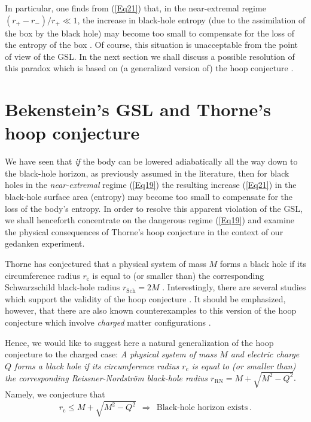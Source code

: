 \documentclass[12pt,preprintnumbers,amsmath,amssymbm,prd]{revtex4-1}
\begin{document}
In particular, one finds from (\ref{Eq21}) that, in the
near-extremal regime $(r_+-r_-)/r_+\ll1$, the increase in black-hole
entropy (due to the assimilation of the box by the black hole) may
become too small to compensate for the loss of the entropy of the
box \cite{Noteneg}. Of course, this situation is unacceptable from
the point of view of the GSL. In the next section we shall discuss a
possible resolution of this paradox which is based on (a generalized
version of) the hoop conjecture \cite{Thorne}.

\section{Bekenstein's GSL and Thorne's hoop conjecture}

We have seen that {\it if} the body can be lowered adiabatically all
the way down to the black-hole horizon, as previously assumed in the
literature, then for black holes in the {\it near-extremal} regime
(\ref{Eq19}) the resulting increase (\ref{Eq21}) in the black-hole
surface area (entropy) may become too small to compensate for the
loss of the body's entropy. In order to resolve this apparent
violation of the GSL, we shall henceforth concentrate on the
dangerous regime (\ref{Eq19}) and examine the physical consequences
of Thorne's hoop conjecture \cite{Thorne} in the context of our
gedanken experiment.

Thorne \cite{Thorne} has conjectured that a physical system of mass
$M$ forms a black hole if its circumference radius $r_{\text{c}}$ is
equal to (or smaller than) the corresponding Schwarzschild
black-hole radius $r_{\text{Sch}}=2M$ \cite{Norefr}. Interestingly,
there are several studies which support the validity of the hoop
conjecture \cite{Teuk}. It should be emphasized, however, that there
are also known counterexamples to this version of the hoop
conjecture which involve {\it charged} matter configurations
\cite{Leon,Hak}.

Hence, we would like to suggest here a natural generalization of the
hoop conjecture to the charged case: {\it A physical system of mass
$M$ and electric charge $Q$ forms a black hole if its circumference
radius $r_{\text{c}}$ is equal to (or smaller than) the
corresponding Reissner-Nordstr\"om black-hole radius
$r_{\text{RN}}=M+\sqrt{M^2-Q^2}$}. Namely, we conjecture that
\begin{equation}\label{Eq22}
r_{\text{c}}\leq M+\sqrt{M^2-Q^2}\ \  \Longrightarrow \ \
\text{Black-hole horizon exists}\  .
\end{equation}
\end{document}
